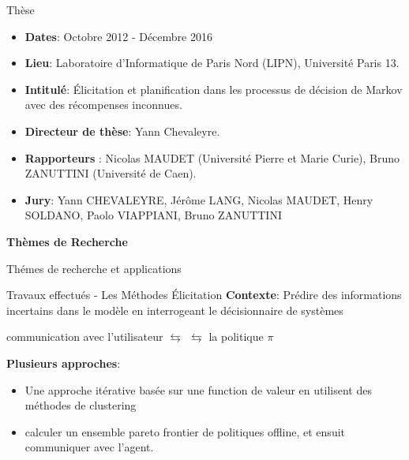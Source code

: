 \documentclass{beamer}
\begin{document}
{\begin{frame}{Thèse}
\begin{itemize} 
\item \textbf{Dates}: Octobre 2012 - Décembre 2016
\item \textbf{Lieu}: Laboratoire d’Informatique de Paris Nord (LIPN),
Université Paris 13.
\item \textbf{Intitulé}: Élicitation et planification dans les processus de
décision de Markov avec des récompenses inconnues.
\item \textbf{Directeur de thèse}: Yann Chevaleyre.
\item \textbf{Rapporteurs} : Nicolas MAUDET (Université Pierre et
Marie Curie), Bruno ZANUTTINI (Université de Caen).
\item \textbf{Jury}: Yann CHEVALEYRE, Jérôme LANG, Nicolas
MAUDET, Henry SOLDANO, Paolo VIAPPIANI, Bruno
ZANUTTINI
\end{itemize}
	
\end{frame}

\begin{frame}
	\begin{center}
	\textbf{Thèmes de Recherche}
	\end{center}
\end{frame}
{


\begin{frame}{Thémes de recherche et applications}

\end{frame}

\begin{frame}{Travaux effectués - Les Méthodes Élicitation}
\textbf{Contexte}: Prédire des informations incertains dans le modèle en interrogeant le décisionnaire de systèmes
\vspace{0.2cm}

\begin{center}
communication avec l’utilisateur $\leftrightarrows$  $\leftrightarrows$ la politique $\pi$
\end{center}
\vspace{0.2cm}

\textbf{Plusieurs approches}:
\begin{itemize}
\item Une approche itérative basée sur une function de valeur en utilisent des méthodes de clustering
\item calculer un ensemble pareto frontier de politiques offline, et ensuit communiquer avec l’agent.
\end{itemize}


\end{frame}}}
\end{document}
